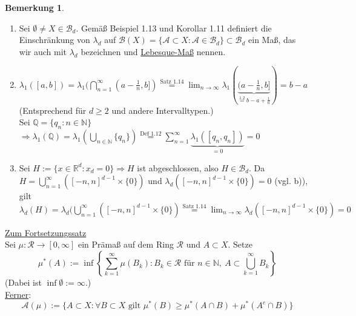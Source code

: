 \documentclass[a4paper]{report}
\newcommand{\R}{\mathbb{R}}
\newcommand{\N}{\mathbb{N}}
\newcommand{\Q}{\mathbb{Q}}
\newcommand{\Borel}{\mathcal{B}}
\newcommand{\toInf}{\rightarrow \infty}
\newcommand{\limToInf}[1]{\lim_{#1 \toInf}}
\newcommand{\Bd}{\Borel_d}
\newcommand{\jlabel}[1]{\label{j_#1}}
\newcommand{\jshortlink}[1]{\jhyperref{#1}{\text{#1}}}
\newcommand{\jhyperref}[2]{\hyperref[j_#1]{#2}}
\theoremstyle{plain}
\theoremstyle{definition}
\newtheorem{bem}[thm]{Bemerkung}
\begin{document}
{{{\jlabel{Bem 1.21}
\begin{bem}
    \begin{enumerate}
        \item Sei $\emptyset \neq X \in \Bd$. Gemäß Beispiel 1.13 und Korollar 1.11 definiert die Einschränkung von $\lambda_d$ auf $\Borel(X)=\{\mathcal{A} \subset X: \mathcal{A} \in \Bd \}\subset \Bd$ ein Maß, das wir auch mit $\lambda_d$ bezeichnen und \uline{Lebesque-Maß} nennen.
        \item $\lambda_1([a,b]) = \lambda_1(\bigcap_{n=1}^\infty (a-\frac{1}{n},b]) \overset{\jshortlink{Satz 1.14}}{=} \limToInf{n} \lambda_1(\underbrace{(a-\frac{1}{n}, b]}_{\overset{\text{1.2}}{=} b-a+\frac{1}{n}}) = b-a$\\
        (Entsprechend für $d\ge2$ und andere Intervalltypen.)\\
        Sei $\Q = \{q_n : n\in\N\}$\\$\Rightarrow \lambda_1(\Q) = \lambda_1(\bigcup_{n\in\N} \{q_n\}) \overset{\jshortlink{Def 1.12}}{=} \sum_{n=1}^\infty \underbrace{\lambda_1([q_n, q_n])}_{=0} = 0$
        \item Sei $H := \{x \in \R^d : x_d = 0\} \Rightarrow H$ ist abgeschlossen, also $H\in \Bd$. Da $H=\bigcup_{n=1}^\infty ([-n,n]^{d-1} \times \{0\})$ und $\lambda_d([-n,n]^{d-1} \times \{0\}) = 0$ (vgl. b)), gilt $\lambda_d(H) = \lambda_d(\bigcup_{n=1}^\infty ([-n,n]^{d-1} \times \{0\}) \overset{\jshortlink{Satz 1.14}}{=} \limToInf{n} \lambda_d([-n,n]^{d-1} \times \{0\}) = 0$
    \end{enumerate}
\end{bem}
\uline{Zum Fortsetzungssatz}\\
Sei $\mu: \mathcal{R} \rightarrow [0,\infty]$ ein Prämaß auf dem Ring $\mathcal{R}$ und $A\subset X$. Setze
\jlabel{(1.8)}
\begin{equation}
    \mu^*(A) := \inf \left \{\sum_{k=1}^\infty \mu(B_k) : B_k \in \mathcal{R} \text{ für } n\in\N,\ A \subset \bigcup_{k=1}^\infty B_k \right \}    
\end{equation}
(Dabei ist $\inf \emptyset := \infty$.)\\
\uline{Ferner}:
\jlabel{(1.9)}
\begin{equation}
    \mathcal{A}(\mu) := \{A \subset X: \forall B \subset X \text{ gilt }\mu^*(B)\ge \mu^*(A\cap B) + \mu^*(A^c\cap B) \}
\end{equation}

}}}
\end{document}
